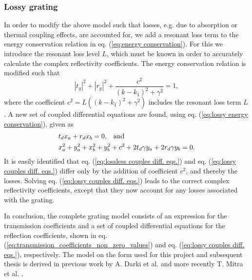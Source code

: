 \subsubsection{Lossy grating}

In order to modify the above model such that losses, e.g. due to absorption or thermal coupling effects, are accounted for, we add a resonant loss term to the energy conservation relation in eq. (\ref{eq:energy conservation}). For this we introduce the resonant loss level $L$, which must be known in order to accurately calculate the complex reflectivity coefficients. The energy conservation relation is modified such that
\begin{equation}
    |t_g|^2 + |r_g|^2 + \frac{c^2}{(k - k_1)^2 + \gamma^2} = 1,
    \label{eq:lossy energy conservation}
\end{equation}
where the coefficient $c^2 = L((k-k_1)^2 + \gamma^2)$ includes the resonant loss term $L$. A new set of coupled differential equations are found, using eq. (\ref{eq:lossy energy conservation}), given as
\begin{equation}
    \begin{split}
        &t_d x_a + r_d x_b = 0, \hspace{0.3cm} \text{and} \\
        &x_a^2 + y_a^2 + x_b^2 + y_b^2 + c^2 +  2 t_d \gamma y_a + 2 r_d \gamma y_b = 0.
    \end{split}
    \label{eq:lossy couples diff. eqs.}
\end{equation}
It is easily identified that eq. (\ref{eq:lossless couples diff. eqs.}) and eq. (\ref{eq:lossy couples diff. eqs.}) differ only by the addition of coefficient $c^2$, and thereby the losses. Solving eq. (\ref{eq:lossy couples diff. eqs.}) leads to the correct complex reflectivity coefficients, except that they now account for any losses associated with the grating. 

In conclusion, the complete grating model consists of an expression for the transmission coefficients and a set of coupled differential equations for the reflection coefficients, shown in eq. (\ref{eq:transmission_coefficients_non_zero_values}) and eq. (\ref{eq:lossy couples diff. eqs.}), respectively. The model on the form used for this project and subsequent thesis is derived in previous work by A. Darki et al. \cite{Darki} and more recently T. Mitra et al. \cite{Mitra}.

